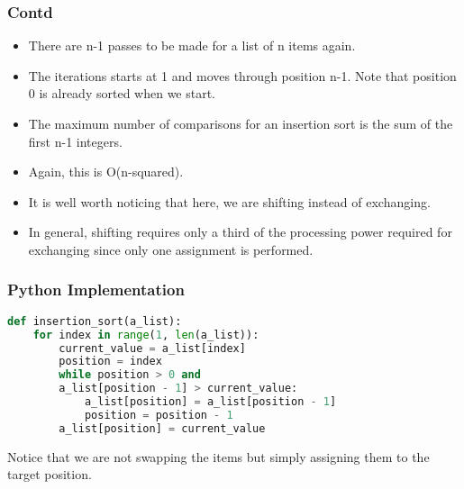 \documentclass{beamer}
\begin{document}
\begin{frame}
\frametitle{Contd}
\begin{itemize}
\item There are n-1 passes to be made for a list of n items again.
\item The iterations starts at 1 and moves through position n-1. Note that position 0 is already sorted when we start.
\item The maximum number of comparisons for an insertion sort is the sum of the first n-1 integers.
\item Again, this is O(n-squared).
\item It is well worth noticing that here, we are shifting instead of exchanging. 
\item In general, shifting requires only a third of the processing power required for exchanging since only one assignment is performed. 
\end{itemize}
\end{frame}

\begin{frame}[fragile]
\frametitle{Python Implementation}
\begin{lstlisting}[language=Python]
def insertion_sort(a_list):
    for index in range(1, len(a_list)):
        current_value = a_list[index]
        position = index
        while position > 0 and 
        a_list[position - 1] > current_value:
            a_list[position] = a_list[position - 1]
            position = position - 1
        a_list[position] = current_value
\end{lstlisting}
Notice that we are not swapping the items but simply assigning them to the target position.
\end{frame}
\end{document}
